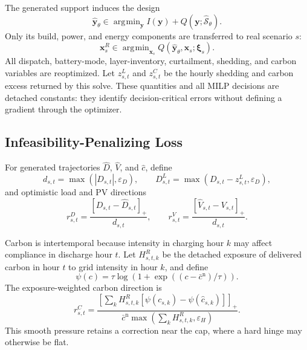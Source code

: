 \documentclass[times]{elsarticle}
\DeclareMathOperator*{\argmin}{\arg\!\min}
\begin{document}
The generated support induces the design
\begin{equation}
\widehat{\bm y}_\theta\in\argmin_{\bm y}
I(\bm y)+Q(\bm y;\widehat{\mathcal S}_\theta).
\label{eq:forward_plan}
\end{equation}
Only its build, power, and energy components are transferred to real scenario
$s$:
\begin{equation}
\bm x_s^R\in\argmin_{\bm x_s}
Q(\widehat{\bm y}_\theta,\bm x_s;\bm\xi_s).
\label{eq:fixed_recourse}
\end{equation}
All dispatch, battery-mode, layer-inventory, curtailment, shedding, and carbon
variables are reoptimized. Let $z^L_{s,t}$ and $z^C_{s,t}$ be the hourly
shedding and carbon excess returned by this solve. These quantities and all
MILP decisions are detached constants: they identify decision-critical errors
without defining a gradient through the optimizer.

\subsection{Infeasibility-Penalizing Loss}

For generated trajectories $\widehat D$, $\widehat V$, and $\widehat c$, define
\begin{equation}
d_{s,t}=\max(|D_{s,t}|,\varepsilon_D),\qquad
D^L_{s,t}=\max(D_{s,t}-z^L_{s,t},\varepsilon_D),
\label{eq:loss_scales}
\end{equation}
and optimistic load and PV directions
\begin{equation}
r^D_{s,t}=\frac{\left[D_{s,t}-\widehat D_{s,t}\right]_{+}}{d_{s,t}},\qquad
r^V_{s,t}=\frac{\left[\widehat V_{s,t}-V_{s,t}\right]_{+}}{d_{s,t}}.
\label{eq:load_pv_direction}
\end{equation}

Carbon is intertemporal because intensity in charging hour $k$ may affect
compliance in discharge hour $t$. Let $H^R_{s,t,k}$ be the detached exposure of
delivered carbon in hour $t$ to grid intensity in hour $k$, and define
\begin{equation}
\psi(c)=\tau\log\left(1+\exp((c-\bar c^{\mathrm n})/\tau)\right).
\label{eq:pressure}
\end{equation}
The exposure-weighted carbon direction is
\begin{equation}
r^C_{s,t}=
\frac{\left[\sum_kH^R_{s,t,k}[\psi(c_{s,k})-\psi(\widehat c_{s,k})]\right]_{+}}
{\bar c^{\mathrm n}\max(\sum_kH^R_{s,t,k},\varepsilon_H)}.
\label{eq:carbon_direction}
\end{equation}
This smooth pressure retains a correction near the cap, where a hard hinge may
otherwise be flat.
\end{document}
